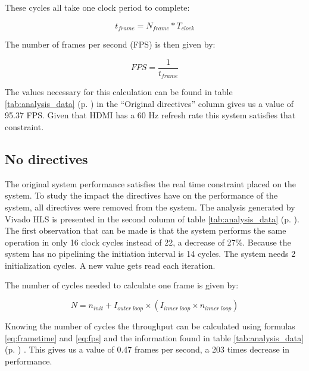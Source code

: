 These cycles all take one clock period to complete:

\begin{equation}\label{eq:frametime}
t_{frame} = N_{frame} * T_{clock}
\end{equation}

The number of frames per second (FPS) is then given by:

\begin{equation}\label{eq:fps}
FPS = \frac{1}{t_{frame}}
\end{equation}

The values necessary for this calculation can be found in table \ref{tab:analysis_data} (p. \pageref{tab:analysis_data}) in the ``Original directives'' column gives us a value of 95.37 FPS. Given that HDMI has a 60 Hz refresh rate this system satisfies that constraint.


\subsection{No directives}
\label{sec:nopragma}

The original system performance satisfies the real time constraint placed on the system. To study the impact the directives have on the performance of the system, all directives were removed from the  system. The analysis generated by Vivado HLS is presented in the second column of table \ref{tab:analysis_data} (p. \pageref{tab:analysis_data}). The first observation that can be made is that the system performs the same operation in only 16 clock cycles instead of 22, a decrease of 27\%. Because the system has no pipelining the initiation interval is 14 cycles. The system needs 2 initialization cycles. A new value gets read each iteration.

The number of cycles needed to calculate one frame is given by:

\begin{equation}
N = n_{init} + I_{outer\;loop} \times (I_{inner\;loop} \times n_{inner\;loop})
\end{equation}



Knowing the number of cycles the throughput can be calculated using formulas \ref{eq:frametime} and \ref{eq:fps} and the information found in table 
\ref{tab:analysis_data} (p. \pageref{tab:analysis_data}) . This gives us a value of 0.47 frames per second, a 203 times decrease in performance.

